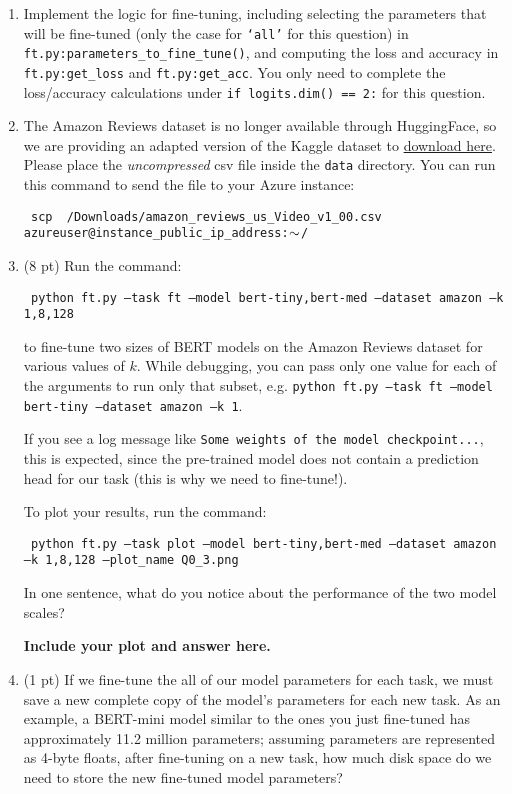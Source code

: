 \documentclass[12pt]{article}
\begin{document}
\begin{enumerate}
    \item Implement the logic for fine-tuning, including selecting the parameters that will be fine-tuned (only the case for \texttt{`all'} for this question) in \texttt{ft.py:\allowbreak parameters\_to\allowbreak \_fine\_tune()}, and computing the loss and accuracy in \texttt{ft.py:\allowbreak get\_loss} and \texttt{ft.py:\allowbreak get\_acc}. You only need to complete the loss/accuracy calculations under \texttt{if logits.dim() == 2:} for this question.
    \item The Amazon Reviews dataset is no longer available through HuggingFace, so we are providing an adapted version of the Kaggle dataset to \href{https://drive.google.com/file/d/1RLCPCEvJVTvUbn-D426Avwg6hynSBgU3/view?usp=sharing}{download here}. Please place the \textit{uncompressed} csv file inside the \texttt{data} directory. You can run this command to send the file to your Azure instance:

    {
    \small\texttt{
    scp ~/Downloads/amazon\_reviews\_us\_Video\_v1\_00.csv azureuser@{instance\_public\_ip\_address}:$\small\sim$/
    }
    }
    \item (8 pt) Run the command:
    
    {\small\texttt{
    python ft.py --task ft --model bert-tiny,bert-med --dataset amazon --k 1,8,128
    }}
    
    to fine-tune two sizes of BERT models on the Amazon Reviews dataset for various values of $k$. While debugging, you can pass only one value for each of the arguments to run only that subset, e.g. \texttt{python ft.py --task ft --model bert-tiny --dataset amazon --k 1}.
    
    If you see a log message like \texttt{Some weights of the model checkpoint...}, this is expected, since the pre-trained model does not contain a prediction head for our task (this is why we need to fine-tune!).

    To plot your results, run the command:
    
    {\small\texttt{
    python ft.py --task plot --model bert-tiny,bert-med --dataset amazon --k 1,8,128 --plot\_name Q0\_3.png
    }}
    
    In one sentence, what do you notice about the performance of the two model scales?
    
    \textbf{\color{red}Include your plot and answer here.}

    \item (1 pt) If we fine-tune the all of our model parameters for each task, we must save a new complete copy of the model's parameters for each new task. As an example, a BERT-mini model similar to the ones you just fine-tuned has approximately 11.2 million parameters; assuming parameters are represented as 4-byte floats, after fine-tuning on a new task, how much disk space do we need to store the new fine-tuned model parameters?


\end{enumerate}
\end{document}
